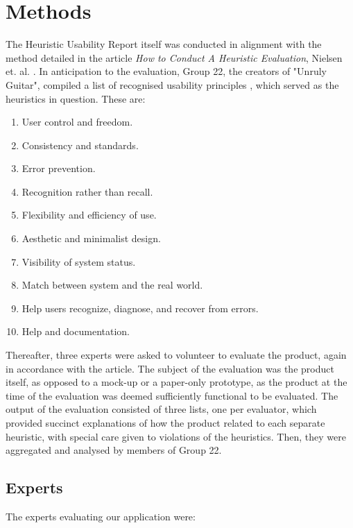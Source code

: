 \section{Methods}

The Heuristic Usability Report itself was conducted in alignment with the method detailed in the article \emph{How to Conduct A Heuristic Evaluation}, Nielsen et. al. \cite{how-to-coduct-a-heuristic-evaluation}. In anticipation to the evaluation, Group 22, the creators of "Unruly Guitar", compiled a list of recognised usability principles \cite{list-of-heuristics}, which served as the heuristics in question. These are:

\begin{enumerate}
    \item User control and freedom.
    \item Consistency and standards.
    \item Error prevention.
    \item Recognition rather than recall.
    \item Flexibility and efficiency of use.
    \item Aesthetic and minimalist design.
    \item Visibility of system status.
    \item Match between system and the real world.
    \item Help users recognize, diagnose, and recover from errors.
    \item Help and documentation.
\end{enumerate} 

Thereafter, three experts were asked to volunteer to evaluate the product, again in accordance with the article. The subject of the evaluation was the product itself, as opposed to a mock-up or a paper-only prototype, as the product at the time of the evaluation was deemed sufficiently functional to be evaluated. The output of the evaluation consisted of three lists, one per evaluator, which provided succinct explanations of how the product related to each separate heuristic, with special care given to violations of the heuristics. Then, they were aggregated and analysed by members of Group 22. 

\subsection{Experts}

The experts evaluating our application were:

